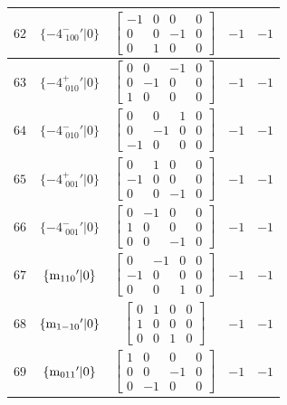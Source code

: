 \documentclass[fleqn,8pt]{jsarticle}
\begin{document}
\begin{longtable}{ccccc}
$ 62 $ & $ \{-4^{-}_{\,\,100}{}'|0\} $ & $ \begin{bmatrix} -1 & 0 & 0 & 0 \\ 0 & 0 & -1 & 0 \\ 0 & 1 & 0 & 0 \end{bmatrix} $ & $ -1 $ & $ -1 $ \\ \hline
$ 63 $ & $ \{-4^{+}_{\,\,010}{}'|0\} $ & $ \begin{bmatrix} 0 & 0 & -1 & 0 \\ 0 & -1 & 0 & 0 \\ 1 & 0 & 0 & 0 \end{bmatrix} $ & $ -1 $ & $ -1 $ \\ \hline
$ 64 $ & $ \{-4^{-}_{\,\,010}{}'|0\} $ & $ \begin{bmatrix} 0 & 0 & 1 & 0 \\ 0 & -1 & 0 & 0 \\ -1 & 0 & 0 & 0 \end{bmatrix} $ & $ -1 $ & $ -1 $ \\ \hline
$ 65 $ & $ \{-4^{+}_{\,\,001}{}'|0\} $ & $ \begin{bmatrix} 0 & 1 & 0 & 0 \\ -1 & 0 & 0 & 0 \\ 0 & 0 & -1 & 0 \end{bmatrix} $ & $ -1 $ & $ -1 $ \\ \hline
$ 66 $ & $ \{-4^{-}_{\,\,001}{}'|0\} $ & $ \begin{bmatrix} 0 & -1 & 0 & 0 \\ 1 & 0 & 0 & 0 \\ 0 & 0 & -1 & 0 \end{bmatrix} $ & $ -1 $ & $ -1 $ \\ \hline
$ 67 $ & $ \{{\rm m}_{110}{}'|0\} $ & $ \begin{bmatrix} 0 & -1 & 0 & 0 \\ -1 & 0 & 0 & 0 \\ 0 & 0 & 1 & 0 \end{bmatrix} $ & $ -1 $ & $ -1 $ \\ \hline
$ 68 $ & $ \{{\rm m}_{1-10}{}'|0\} $ & $ \begin{bmatrix} 0 & 1 & 0 & 0 \\ 1 & 0 & 0 & 0 \\ 0 & 0 & 1 & 0 \end{bmatrix} $ & $ -1 $ & $ -1 $ \\ \hline
$ 69 $ & $ \{{\rm m}_{011}{}'|0\} $ & $ \begin{bmatrix} 1 & 0 & 0 & 0 \\ 0 & 0 & -1 & 0 \\ 0 & -1 & 0 & 0 \end{bmatrix} $ & $ -1 $ & $ -1 $ \\ \hline

\end{longtable}
\end{document}
